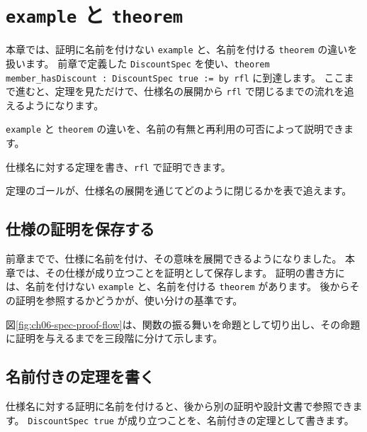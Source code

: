\chapter{\texttt{example} と \texttt{theorem}}
\label{chap:ch06_example_theorem}

\begin{chapterabstract}
本章では、証明に名前を付けない \texttt{example} と、名前を付ける \texttt{theorem} の違いを扱います。
前章で定義した \texttt{DiscountSpec} を使い、\texttt{theorem member\_hasDiscount : DiscountSpec true := by rfl} に到達します。
ここまで進むと、定理を見ただけで、仕様名の展開から \texttt{rfl} で閉じるまでの流れを追えるようになります。
\end{chapterabstract}

\begin{learninggoals}
\item \texttt{example} と \texttt{theorem} の違いを、名前の有無と再利用の可否によって説明できます。
\item 仕様名に対する定理を書き、\texttt{rfl} で証明できます。
\item 定理のゴールが、仕様名の展開を通じてどのように閉じるかを表で追えます。
\end{learninggoals}

\section{仕様の証明を保存する}

前章までで、仕様に名前を付け、その意味を展開できるようになりました。
本章では、その仕様が成り立つことを証明として保存します。
証明の書き方には、名前を付けない \texttt{example} と、名前を付ける \texttt{theorem} があります。
後からその証明を参照するかどうかが、使い分けの基準です。

図\ref{fig:ch06-spec-proof-flow}は、関数の振る舞いを命題として切り出し、その命題に証明を与えるまでを三段階に分けて示します。


\section{名前付きの定理を書く}

仕様名に対する証明に名前を付けると、後から別の証明や設計文書で参照できます。
\texttt{DiscountSpec true} が成り立つことを、名前付きの定理として書きます。

